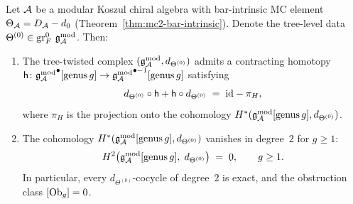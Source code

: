 \begin{theorem}
\label{thm:thqg-VII-contracting-homotopy}
Let $\mathcal{A}$ be a modular Koszul chiral algebra with bar-intrinsic
MC element $\Theta_{\mathcal{A}} = D_{\mathcal{A}} - d_0$
\textup{(}Theorem~\textup{\ref{thm:mc2-bar-intrinsic})}. Denote
the tree-level data $\Theta^{(0)} \in \operatorname{gr}^0_F\,\mathfrak{g}_{\mathcal{A}}^{\mathrm{mod}}$. Then:

\begin{enumerate}[label=\textup{(\roman*)}]
\item The tree-twisted complex $(\mathfrak{g}_{\mathcal{A}}^{\mathrm{mod}}, d_{\Theta^{(0)}})$
 admits a contracting homotopy
 $\mathsf{h} \colon {\mathfrak{g}_{\mathcal{A}}^{\mathrm{mod}}}^{\bullet}[\mathrm{genus\,}g]
 \to {\mathfrak{g}_{\mathcal{A}}^{\mathrm{mod}}}^{\bullet - 1}[\mathrm{genus\,}g]$
 satisfying
 \begin{equation}\label{eq:thqg-VII-homotopy}
 d_{\Theta^{(0)}} \circ \mathsf{h}
 + \mathsf{h} \circ d_{\Theta^{(0)}}
 \;=\; \mathrm{id} - \pi_H,
 \end{equation}
 where $\pi_H$ is the projection onto the cohomology
 $H^*(\mathfrak{g}_{\mathcal{A}}^{\mathrm{mod}}[\mathrm{genus\,}g], d_{\Theta^{(0)}})$.

\item The cohomology $H^*(\mathfrak{g}_{\mathcal{A}}^{\mathrm{mod}}[\mathrm{genus\,}g],
 d_{\Theta^{(0)}})$ vanishes in degree~$2$ for $g \geq 1$:
 \begin{equation}\label{eq:thqg-VII-h2-vanishing}
 H^2\bigl(\mathfrak{g}_{\mathcal{A}}^{\mathrm{mod}}[\mathrm{genus\,}g],\; d_{\Theta^{(0)}}\bigr)
 \;=\; 0, \qquad g \geq 1.
 \end{equation}
 In particular, every $d_{\Theta^{(0)}}$-cocycle of
 degree~$2$ is exact, and the obstruction class $[\mathrm{Ob}_g] = 0$.
\end{enumerate}
\end{theorem}

